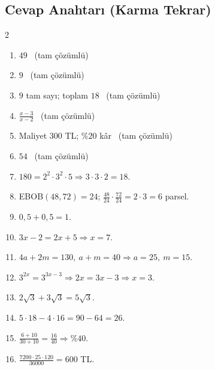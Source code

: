 \subsection*{Cevap Anahtarı (Karma Tekrar)}
{\small
\begin{multicols}{2}
\begin{enumerate}[label=\textbf{\arabic*.},leftmargin=*,itemsep=1pt]
\item \(49\) \ (tam çözümlü)
\item \(9\) \ (tam çözümlü)
\item \(9\) tam sayı; toplam \(18\) \ (tam çözümlü)
\item \(\frac{x-3}{x-2}\) \ (tam çözümlü)
\item Maliyet \(300\) TL; \(\%20\) kâr \ (tam çözümlü)
\item \(54\) \ (tam çözümlü)
\item \(180=2^2\cdot 3^2\cdot 5\Rightarrow 3\cdot 3\cdot 2=18\).
\item EBOB\((48,72)=24\); \(\frac{48}{24}\cdot\frac{72}{24}=2\cdot 3=6\) parsel.
\item \(0{,}5+0{,}5=1\).
\item \(3x-2=2x+5\Rightarrow x=7\).
\item \(4a+2m=130,\ a+m=40\Rightarrow a=25,\ m=15\).
\item \(3^{2x}=3^{3x-3}\Rightarrow 2x=3x-3\Rightarrow x=3\).
\item \(2\sqrt{3}+3\sqrt{3}=5\sqrt{3}\).
\item \(5\cdot 18-4\cdot 16=90-64=26\).
\item \(\frac{6+10}{30+10}=\frac{16}{40}\Rightarrow\%40\).
\item \(\frac{7200\cdot 25\cdot 120}{36000}=600\) TL.
\end{enumerate}
\end{multicols}}
